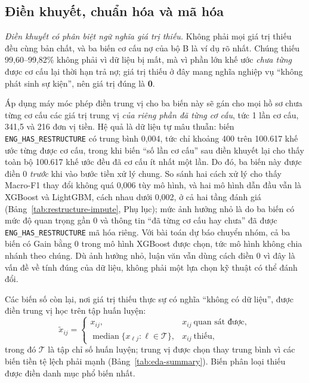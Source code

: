 \subsection{Điền khuyết, chuẩn hóa và mã hóa}
\label{sec:preprocessing-examples}

\noindent\textit{Điền khuyết có phân biệt ngữ nghĩa giá trị thiếu.} Không phải mọi giá trị thiếu đều cùng bản chất, và ba biến cơ cấu nợ của bộ B là ví dụ rõ nhất. Chúng thiếu 99,60--99,82\% không phải vì dữ liệu bị mất, mà vì phần lớn khế ước \emph{chưa từng} được cơ cấu lại thời hạn trả nợ; giá trị thiếu ở đây mang nghĩa nghiệp vụ ``không phát sinh sự kiện'', nên giá trị đúng là \textbf{0}.

Áp dụng máy móc phép điền trung vị cho ba biến này sẽ gán cho mọi hồ sơ chưa từng cơ cấu các giá trị trung vị \emph{của riêng phần đã từng cơ cấu}, tức 1 lần cơ cấu, 341,5 và 216 đơn vị tiền. Hệ quả là dữ liệu tự mâu thuẫn: biến \mbox{\texttt{ENG\_HAS\_RESTRUCTURE}} có trung bình 0,004, tức chỉ khoảng 400 trên 100.617 khế ước từng được cơ cấu, trong khi biến ``số lần cơ cấu'' sau điền khuyết lại cho thấy toàn bộ 100.617 khế ước đều đã cơ cấu ít nhất một lần. Do đó, ba biến này được điền 0 \emph{trước} khi vào bước tiền xử lý chung. So sánh hai cách xử lý cho thấy Macro-F1 thay đổi không quá 0,006 tùy mô hình, và hai mô hình dẫn đầu vẫn là XGBoost và LightGBM, cách nhau dưới 0,002, ở cả hai tầng đánh giá (Bảng~\ref{tab:restructure-impute}, Phụ lục); mức ảnh hưởng nhỏ là do ba biến có mức độ quan trọng gần 0 và thông tin ``đã từng cơ cấu hay chưa'' đã được \mbox{\texttt{ENG\_HAS\_RESTRUCTURE}} mã hóa riêng. Với bài toán dự báo chuyển nhóm, cả ba biến có Gain bằng 0 trong mô hình XGBoost được chọn, tức mô hình không chia nhánh theo chúng. Dù ảnh hưởng nhỏ, luận văn vẫn dùng cách điền 0 vì đây là vấn đề về tính đúng của dữ liệu, không phải một lựa chọn kỹ thuật có thể đánh đổi.

Các biến số còn lại, nơi giá trị thiếu thực sự có nghĩa ``không có dữ liệu'', được điền trung vị học trên tập huấn luyện:
\[
\tilde{x}_{ij}=
\begin{cases}
x_{ij}, & x_{ij}\ \text{quan sát được},\\
\operatorname{median}\{x_{\ell j}:\ell\in\mathcal{T}\}, & x_{ij}\ \text{thiếu},
\end{cases}
\]
trong đó $\mathcal{T}$ là tập chỉ số huấn luyện; trung vị được chọn thay trung bình vì các biến tiền tệ lệch phải mạnh (Bảng~\ref{tab:eda-summary}). Biến phân loại thiếu được điền danh mục phổ biến nhất.

